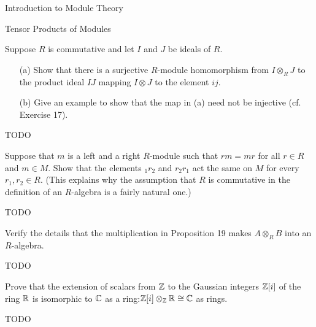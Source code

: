 \begin{chapter}{Introduction to Module Theory}
\begin{section}{Tensor Products of Modules}
\begin{solution}
\end{solution}\oneperpage



\begin{problem}\label{ex:10.4.21}
Suppose $R$ is commutative and let $I$ and $J$ be ideals of $R$. 
\begin{enumerate}
\item[(a)] Show that there is a surjective $R$-module homomorphism from $I\otimes_R J$ to the product ideal $IJ$ mapping $I\otimes J$ to the element $ij$.
\item[(b)] Give an example to show that the map in (a) need not be injective (cf. Exercise 17). 
\end{enumerate}
\end{problem}
\begin{solution}TODO

\end{solution}\oneperpage



\begin{problem}\label{ex:10.4.22}
Suppose that $m$ is a left and a right $R$-module such that $rm=mr$ for all $r\in R$ and $m\in M$. Show that the elements $_1r_2$ and $r_2r_1$ act the same on $M$ for every $r_1,r_2\in R$. (This explains why the assumption that $R$ is commutative in the definition of an $R$-algebra is a fairly natural one.) 
\end{problem}
\begin{solution}TODO

\end{solution}\oneperpage



\begin{problem}\label{ex:10.4.23}
Verify the details that the multiplication in Proposition 19 makes $A\otimes_R B$ into an $R$-algebra.
\end{problem}
\begin{solution}TODO

\end{solution}\oneperpage



\begin{problem}\label{ex:10.4.24}
Prove that the extension of scalars from $\mathbb{Z}$ to the Gaussian integers $\mathbb{Z}[i]$ of the ring $\mathbb{R}$ is isomorphic to $\mathbb{C}$ as a ring:$\mathbb{Z}[i]\otimes_{\mathbb{Z}}\mathbb{R}\cong\mathbb{C}$ as rings. 
\end{problem}
\begin{solution}TODO


\end{solution}
\end{section}
\end{chapter}
